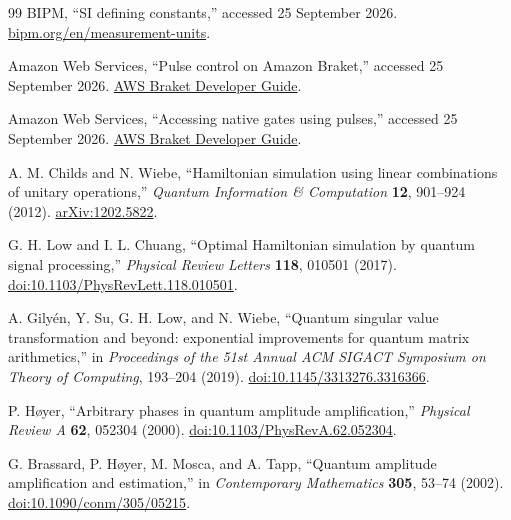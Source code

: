 \documentclass[11pt]{article}
\theoremstyle{definition}
\theoremstyle{remark}
\begin{document}
\begin{thebibliography}{99}
BIPM, ``SI defining constants,'' accessed 25 September 2026. \href{https://www.bipm.org/en/measurement-units}{bipm.org/en/measurement-units}.

Amazon Web Services, ``Pulse control on Amazon Braket,'' accessed 25 September 2026. \href{https://docs.aws.amazon.com/braket/latest/developerguide/braket-pulse-control.html}{AWS Braket Developer Guide}.

Amazon Web Services, ``Accessing native gates using pulses,'' accessed 25 September 2026. \href{https://docs.aws.amazon.com/braket/latest/developerguide/braket-native-gate-pulse.html}{AWS Braket Developer Guide}.

A. M. Childs and N. Wiebe, ``Hamiltonian simulation using linear combinations of unitary operations,'' \emph{Quantum Information \& Computation} \textbf{12}, 901--924 (2012). \href{https://arxiv.org/abs/1202.5822}{arXiv:1202.5822}.

G. H. Low and I. L. Chuang, ``Optimal Hamiltonian simulation by quantum signal processing,'' \emph{Physical Review Letters} \textbf{118}, 010501 (2017). \href{https://doi.org/10.1103/PhysRevLett.118.010501}{doi:10.1103/PhysRevLett.118.010501}.

A. Gily\'en, Y. Su, G. H. Low, and N. Wiebe, ``Quantum singular value transformation and beyond: exponential improvements for quantum matrix arithmetics,'' in \emph{Proceedings of the 51st Annual ACM SIGACT Symposium on Theory of Computing}, 193--204 (2019). \href{https://doi.org/10.1145/3313276.3316366}{doi:10.1145/3313276.3316366}.

P. H\o yer, ``Arbitrary phases in quantum amplitude amplification,'' \emph{Physical Review A} \textbf{62}, 052304 (2000). \href{https://doi.org/10.1103/PhysRevA.62.052304}{doi:10.1103/PhysRevA.62.052304}.

G. Brassard, P. H\o yer, M. Mosca, and A. Tapp, ``Quantum amplitude amplification and estimation,'' in \emph{Contemporary Mathematics} \textbf{305}, 53--74 (2002). \href{https://doi.org/10.1090/conm/305/05215}{doi:10.1090/conm/305/05215}.

\end{thebibliography}
\end{document}
